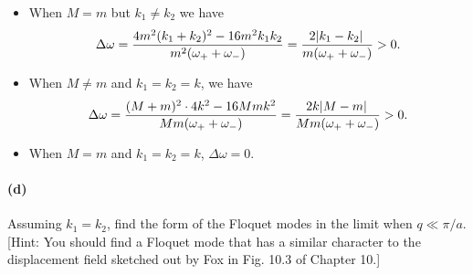 \documentclass[hyperref, a4paper]{article}
\begin{document}
\begin{itemize}
    \item When $M = m$ but $k_1 \neq k_2$ we have 
    \begin{equation}
        \Delta \omega = \frac{
            4m^2 (k_1 + k_2)^2 - 16 m^2 k_1 k_2
        }{m^2 (\omega_+ + \omega_-)}
        = \frac{2 \abs*{k_1 - k_2}}{m (\omega_+ + \omega_-)} > 0.
    \end{equation}
    \item When $M \neq m$ and $k_1 = k_2 = k$, we have 
    \begin{equation}
        \Delta \omega = \frac{
            (M + m)^2 \cdot 4 k^2 - 16 Mm k^2
        }{Mm (\omega_+ + \omega_-)} = \frac{2 k \abs*{M - m}}{Mm (\omega_+ + \omega_-)} > 0.
    \end{equation}
    \item When $M = m$ and $k_1 = k_2 = k$, $\Delta \omega = 0$.
\end{itemize}

\paragraph*{(d)} Assuming $k_1=k_2$, find the form of the Floquet modes in the limit when $q \ll \pi / a$. [Hint: You should find a Floquet mode that has a similar character to the displacement field sketched out by Fox in Fig. 10.3 of Chapter 10.]
\end{document}
